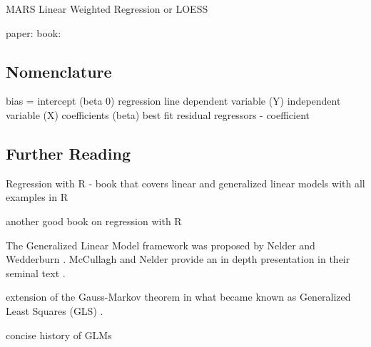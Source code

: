 \begin{bibunit}
MARS
Linear Weighted Regression or LOESS

paper: \cite{Hastie1986}
book: \cite{Hastie1990}



\subsection{Nomenclature}

bias = intercept (beta 0)
regression line
dependent variable (Y)
independent variable (X)
coefficients (beta)
best fit
residual
regressors - coefficient


\subsection{Further Reading}


Regression with R - book that covers linear and generalized linear models with all examples in R \cite{Weisberg2010}

another good book on regression with R \cite{Sheather2009}


The Generalized Linear Model framework was proposed by Nelder and Wedderburn \cite{Nelder1972}. McCullagh and Nelder provide an in depth presentation in their seminal text \cite{McCullagh1989}.

extension of the Gauss-Markov theorem in what became known as Generalized Least Squares (GLS) \cite{Aitken1935}.

concise history of GLMs \cite{McCulloch2000}


\putbib
\end{bibunit}

\newpage\begin{bibunit}\putbib\end{bibunit}
\newpage\begin{bibunit}\putbib\end{bibunit}
\newpage\begin{bibunit}\putbib\end{bibunit}
\newpage\begin{bibunit}\putbib\end{bibunit}
\newpage\begin{bibunit}\putbib\end{bibunit}

